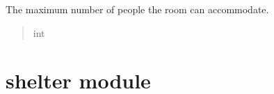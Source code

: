 \documentclass[letterpaper,10pt,english]{sphinxmanual}
\begin{document}
\begin{fulllineitems}
\begin{fulllineitems}
\label{\detokenize{app.mysql:app.mysql.room.Room.maxPeople}}
\pysigstartsignatures
\pysigline
{}
\pysigstopsignatures
\sphinxAtStartPar
The maximum number of people the room can accommodate.
\begin{quote}\begin{description}
\sphinxAtStartPar
int

\end{description}\end{quote}

\end{fulllineitems}


\end{fulllineitems}



\section{shelter module}
\label{\detokenize{app.mysql:module-app.mysql.shelter}}\label{\detokenize{app.mysql:shelter-module}}
\end{document}

